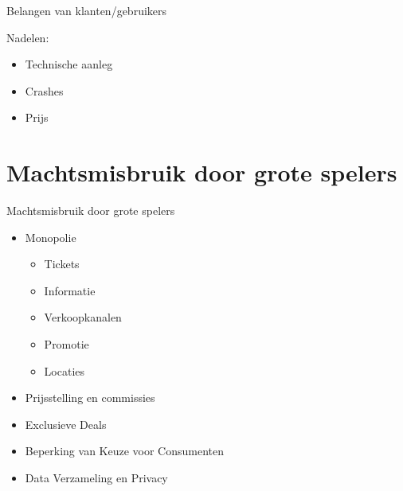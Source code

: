 \documentclass{beamer}
\begin{document}
\begin{frame}{Belangen van klanten/gebruikers}
    \LARGE{
        Nadelen:
        \begin{itemize}
            \item Technische aanleg
            \item Crashes
            \item Prijs
        \end{itemize}
    }
\end{frame}

    
\section[Machtsmisbruik]{Machtsmisbruik door grote spelers}
\begin{frame}{Machtsmisbruik door grote spelers}
    \begin{itemize}
        \item Monopolie
        \begin{itemize}
            \item Tickets
            \item Informatie
            \item Verkoopkanalen
            \item Promotie
            \item Locaties
        \end{itemize}
        \item Prijsstelling en commissies
        \item Exclusieve Deals
        \item Beperking van Keuze voor Consumenten
        \item Data Verzameling en Privacy
  \end{itemize}
\end{frame}

    
\end{document}

